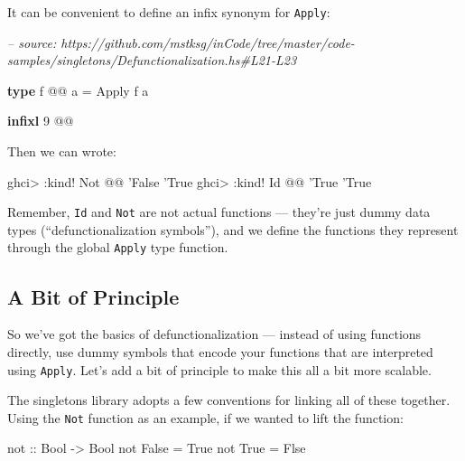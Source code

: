 \documentclass[]{article}
\newenvironment{Shaded}{}{}
\newcommand{\CommentTok}[1]{\textcolor[rgb]{0.38,0.63,0.69}{\textit{#1}}}
\newcommand{\DataTypeTok}[1]{\textcolor[rgb]{0.56,0.13,0.00}{#1}}
\newcommand{\DecValTok}[1]{\textcolor[rgb]{0.25,0.63,0.44}{#1}}
\newcommand{\FunctionTok}[1]{\textcolor[rgb]{0.02,0.16,0.49}{#1}}
\newcommand{\KeywordTok}[1]{\textcolor[rgb]{0.00,0.44,0.13}{\textbf{#1}}}
\newcommand{\NormalTok}[1]{#1}
\newcommand{\OtherTok}[1]{\textcolor[rgb]{0.00,0.44,0.13}{#1}}
\begin{document}
It can be convenient to define an infix synonym for \texttt{Apply}:

\begin{Shaded}
\begin{Highlighting}[]
\CommentTok{-- source: https://github.com/mstksg/inCode/tree/master/code-samples/singletons/Defunctionalization.hs#L21-L23}

\KeywordTok{type}\NormalTok{ f }\FunctionTok{@@}\NormalTok{ a }\FunctionTok{=} \DataTypeTok{Apply}\NormalTok{ f a}

\KeywordTok{infixl} \DecValTok{9} \FunctionTok{@@}
\end{Highlighting}
\end{Shaded}

Then we can wrote:

\begin{Shaded}
\begin{Highlighting}[]
\NormalTok{ghci}\FunctionTok{>} \FunctionTok{:}\NormalTok{kind}\FunctionTok{!} \DataTypeTok{Not} \FunctionTok{@@}\NormalTok{ '}\DataTypeTok{False}
\NormalTok{'}\DataTypeTok{True}
\NormalTok{ghci}\FunctionTok{>} \FunctionTok{:}\NormalTok{kind}\FunctionTok{!} \DataTypeTok{Id} \FunctionTok{@@}\NormalTok{ '}\DataTypeTok{True}
\NormalTok{'}\DataTypeTok{True}
\end{Highlighting}
\end{Shaded}

Remember, \texttt{Id} and \texttt{Not} are not actual functions --- they're just
dummy data types (``defunctionalization symbols''), and we define the functions
they represent through the global \texttt{Apply} type function.

\hypertarget{a-bit-of-principle}{%
\subsection{A Bit of Principle}\label{a-bit-of-principle}}

So we've got the basics of defunctionalization --- instead of using functions
directly, use dummy symbols that encode your functions that are interpreted
using \texttt{Apply}. Let's add a bit of principle to make this all a bit more
scalable.

The singletons library adopts a few conventions for linking all of these
together. Using the \texttt{Not} function as an example, if we wanted to lift
the function:

\begin{Shaded}
\begin{Highlighting}[]
\NormalTok{not}\OtherTok{ ::} \DataTypeTok{Bool} \OtherTok{->} \DataTypeTok{Bool}
\NormalTok{not }\DataTypeTok{False} \FunctionTok{=} \DataTypeTok{True}
\NormalTok{not }\DataTypeTok{True}  \FunctionTok{=} \DataTypeTok{Flse}
\end{Highlighting}
\end{Shaded}
\end{document}
